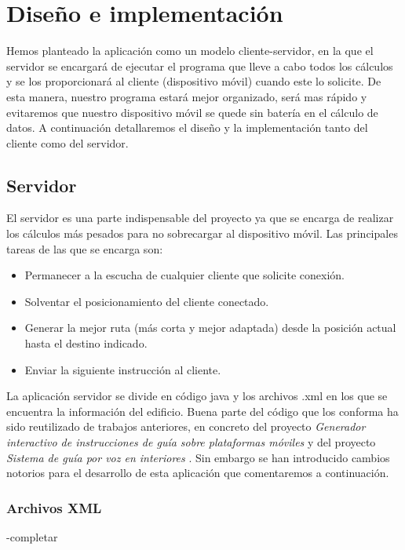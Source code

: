 \chapter{Diseño e implementación}
\label{cap:diseñoeimplementación}


Hemos planteado la aplicación como un modelo cliente-servidor, en la que el servidor se encargará de ejecutar el programa que lleve a cabo todos los cálculos y se los proporcionará al cliente (dispositivo móvil) cuando este lo solicite. De esta manera, nuestro programa estará mejor organizado, será mas rápido y evitaremos que nuestro dispositivo móvil se quede sin batería en el cálculo de datos. A continuación detallaremos el diseño y la implementación tanto del cliente como del servidor.


\section{Servidor}
El servidor es una parte indispensable del proyecto ya que se encarga de realizar los cálculos más pesados para no sobrecargar al dispositivo móvil. Las principales tareas de las que se encarga son:
\begin{itemize}
	\item Permanecer a la escucha de cualquier cliente que solicite conexión.
	\item Solventar el posicionamiento del cliente conectado.
	\item Generar la mejor ruta (más corta y mejor adaptada) desde la posición actual hasta el destino indicado.
	\item Enviar la siguiente instrucción al cliente.	
\end{itemize} 

La aplicación servidor se divide en código java y los archivos .xml en los que se encuentra la información del edificio. Buena parte del código que los conforma ha sido reutilizado de trabajos anteriores, en concreto del proyecto \textit{Generador interactivo de instrucciones de guía sobre plataformas móviles} \citep{TFGguia} y del proyecto \textit{Sistema de guía por voz en interiores} \citep{TFGMariana}. Sin embargo se han introducido cambios notorios para el desarrollo de esta aplicación que comentaremos a continuación.
\subsection{Archivos XML}
-completar
